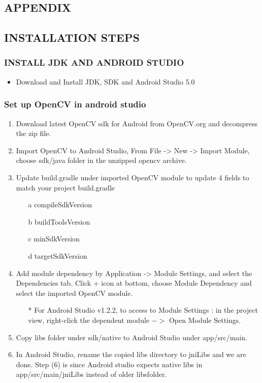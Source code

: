 \documentclass[10pt,a4paper,twoside]{report}
\begin{document}
\begin{appendix}
\chapter{APPENDIX}
\section{INSTALLATION STEPS}
\subsection{INSTALL JDK AND ANDROID STUDIO}
\begin{itemize}
\item Download and Install JDK, SDK and Android Studio 5.0
\end{itemize}
\subsection{Set up OpenCV in android studio}

\begin{enumerate}
\item Download latest OpenCV sdk for Android from OpenCV.org and decompress the zip file.
\item Import OpenCV to Android Studio, From File -> New -> Import Module, choose sdk/java folder in the unzipped opencv archive.
\item Update build.gradle under imported OpenCV module to update 4 fields to match your project build.gradle
\begin{enumerate}
	\item[a] compileSdkVersion
	\item[b] buildToolsVersion
	\item[c] minSdkVersion
	\item[d] targetSdkVersion
\end{enumerate} 
\item Add module dependency by Application -> Module Settings, and select the Dependencies tab. Click + icon at bottom, choose Module Dependency and select the imported OpenCV module.
\begin{itemize}
\item[*] For Android Studio v1.2.2, to access to Module Settings : in the project view, right-click the dependent module $->$ Open Module Settings.
\end{itemize}
\item Copy libs folder under sdk/native to Android Studio under app/src/main.
\item 	In Android Studio, rename the copied libs directory to jniLibs and we are done. Step (6) is since Android studio expects native libs in app/src/main/jniLibs instead of older libsfolder.


\end{enumerate}
\end{appendix}
\end{document}
